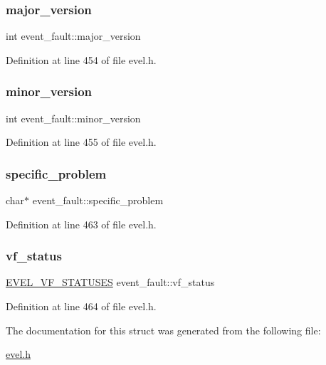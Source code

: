 \hypertarget{structevent__fault_a3b46ee3d4e1b43e028b3f1f8d1bf3abd}{}\label{structevent__fault_a3b46ee3d4e1b43e028b3f1f8d1bf3abd} 
\subsubsection{\texorpdfstring{major\+\_\+version}{major\_version}}
{\footnotesize\ttfamily int event\+\_\+fault\+::major\+\_\+version}



Definition at line 454 of file evel.\+h.

\hypertarget{structevent__fault_ad53af12cb32e84758c8784d50921d0f1}{}\label{structevent__fault_ad53af12cb32e84758c8784d50921d0f1} 
\subsubsection{\texorpdfstring{minor\+\_\+version}{minor\_version}}
{\footnotesize\ttfamily int event\+\_\+fault\+::minor\+\_\+version}



Definition at line 455 of file evel.\+h.

\hypertarget{structevent__fault_ac527105fea5c184089d8b5e7440c5bef}{}\label{structevent__fault_ac527105fea5c184089d8b5e7440c5bef} 
\subsubsection{\texorpdfstring{specific\+\_\+problem}{specific\_problem}}
{\footnotesize\ttfamily char$\ast$ event\+\_\+fault\+::specific\+\_\+problem}



Definition at line 463 of file evel.\+h.

\hypertarget{structevent__fault_aa82d21b95c0d1ef7ab6740a9b52f722f}{}\label{structevent__fault_aa82d21b95c0d1ef7ab6740a9b52f722f} 
\subsubsection{\texorpdfstring{vf\+\_\+status}{vf\_status}}
{\footnotesize\ttfamily \hyperlink{evel_8h_a940888ae37017b9f85d793972994c8f0}{E\+V\+E\+L\+\_\+\+V\+F\+\_\+\+S\+T\+A\+T\+U\+S\+ES} event\+\_\+fault\+::vf\+\_\+status}



Definition at line 464 of file evel.\+h.



The documentation for this struct was generated from the following file\+:\begin{DoxyCompactItemize}
\item 
\hyperlink{evel_8h}{evel.\+h}\end{DoxyCompactItemize}

